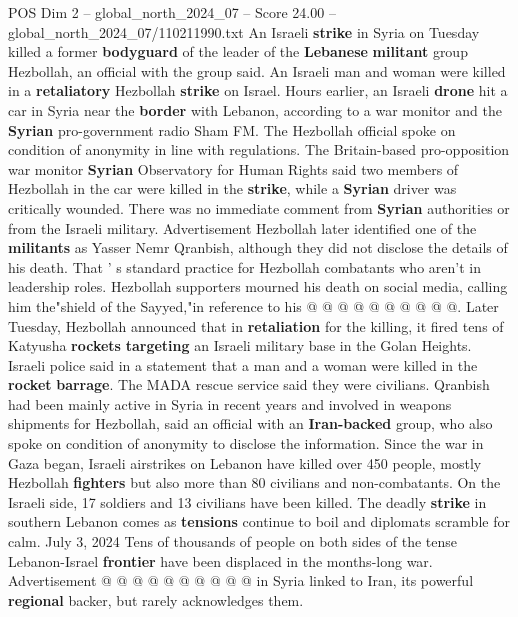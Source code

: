\begin{textsample}{POS Dim 2 – global\_north\_2024\_07 – Score 24.00 – global\_north\_2024\_07/110211990.txt}  \label{ex:f2_pos_188}
An Israeli \textbf{strike} in Syria on Tuesday killed a former \textbf{bodyguard} of the leader of the \textbf{Lebanese} \textbf{militant} group Hezbollah, an official with the group said.
An Israeli man and woman were killed in a \textbf{retaliatory} Hezbollah \textbf{strike} on Israel.
Hours earlier, an Israeli \textbf{drone} hit a car in Syria near the \textbf{border} with Lebanon, according to a war monitor and the \textbf{Syrian} pro-government radio Sham FM.
The Hezbollah official spoke on condition of anonymity in line with regulations.
The Britain-based pro-opposition war monitor \textbf{Syrian} Observatory for Human Rights said two members of Hezbollah in the car were killed in the \textbf{strike}, while a \textbf{Syrian} driver was critically wounded.
There was no immediate comment from \textbf{Syrian} authorities or from the Israeli military.
Advertisement Hezbollah later identified one of the \textbf{militants} as Yasser Nemr Qranbish, although they did not disclose the details of his death.
That ' s standard practice for Hezbollah combatants who aren't in leadership roles.
Hezbollah supporters mourned his death on social media, calling him the"shield of the Sayyed,"in reference to his @ @ @ @ @ @ @ @ @ @.
Later Tuesday, Hezbollah announced that in \textbf{retaliation} for the killing, it fired tens of Katyusha \textbf{rockets} \textbf{targeting} an Israeli military base in the Golan Heights.
Israeli police said in a statement that a man and a woman were killed in the \textbf{rocket} \textbf{barrage}.
The MADA rescue service said they were civilians.
Qranbish had been mainly active in Syria in recent years and involved in weapons shipments for Hezbollah, said an official with an \textbf{Iran-backed} group, who also spoke on condition of anonymity to disclose the information.
Since the war in Gaza began, Israeli airstrikes on Lebanon have killed over 450 people, mostly Hezbollah \textbf{fighters} but also more than 80 civilians and non-combatants.
On the Israeli side, 17 soldiers and 13 civilians have been killed.
The deadly \textbf{strike} in southern Lebanon comes as \textbf{tensions} continue to boil and diplomats scramble for calm.
July 3, 2024 Tens of thousands of people on both sides of the tense Lebanon-Israel \textbf{frontier} have been displaced in the months-long war.
Advertisement @ @ @ @ @ @ @ @ @ @ in Syria linked to Iran, its powerful \textbf{regional} backer, but rarely acknowledges them.

\end{textsample}
